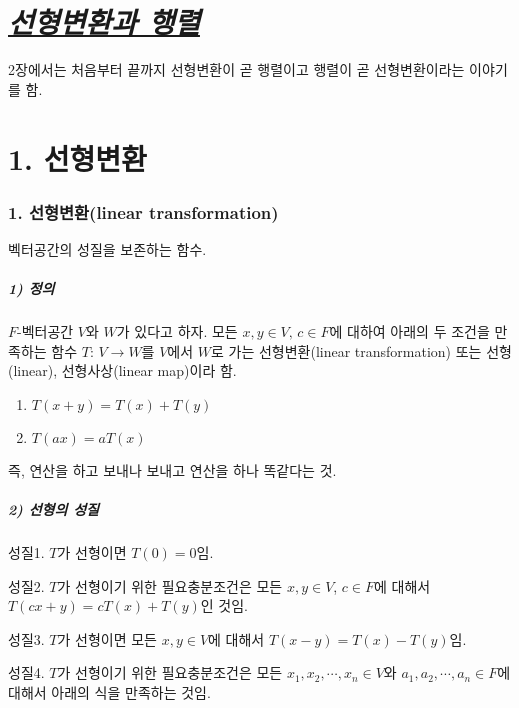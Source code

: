\part{\textit{\underline{선형변환과 행렬}}}

2장에서는 처음부터 끝까지 선형변환이 곧 행렬이고 행렬이 곧 선형변환이라는 이야기를 함.

\part*{1. 선형변환}

\section*{1. 선형변환(linear transformation)}

벡터공간의 성질을 보존하는 함수.

\subsubsection*{1) 정의\\}
\begin{DEF}
$F$-벡터공간 $V$와 $W$가 있다고 하자. 모든 $x,y \in V,\,c \in F$에 대하여 아래의 두 조건을 만족하는 함수 $T:\,V \rightarrow W$를 $V$에서 $W$로 가는 선형변환(linear transformation) 또는 선형(linear), 선형사상(linear map)이라 함.

\begin{enumerate}
\item $T(x+y)=T(x)+T(y)$
\item $T(ax)=aT(x)$
\end{enumerate}
\end{DEF}

즉, 연산을 하고 보내나 보내고 연산을 하나 똑같다는 것.

\subsubsection*{2) 선형의 성질}
성질1. $T$가 선형이면 $T(0)=0$임.

성질2. $T$가 선형이기 위한 필요충분조건은 모든 $x,y \in V$, $c \in F$에 대해서 $T(cx+y)=cT(x)+T(y)$인 것임.

성질3. $T$가 선형이면 모든 $x,y \in V$에 대해서 $T(x-y)=T(x)-T(y)$임.

성질4. $T$가 선형이기 위한 필요충분조건은 모든 $x_1,x_2, \cdots ,x_n \in V$와 $a_1,a_2, \cdots ,a_n \in F$에 대해서 아래의 식을 만족하는 것임.

